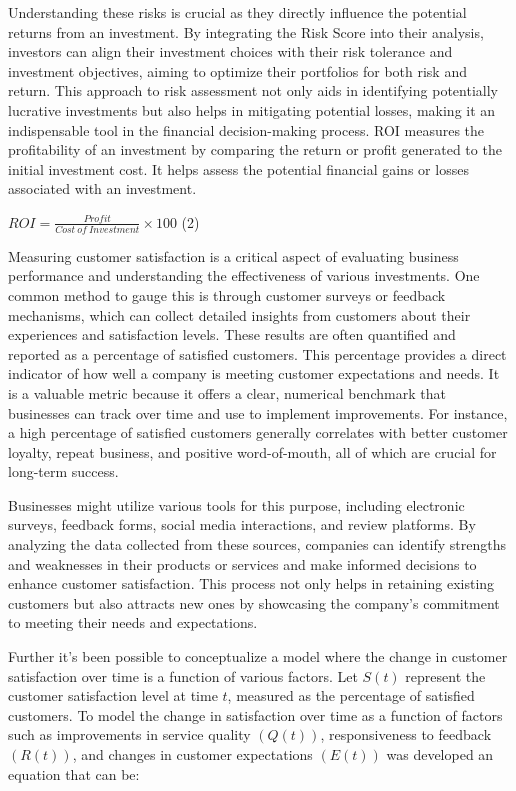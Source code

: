 \documentclass[
]{article}
\begin{document}
Understanding these risks is crucial as they directly influence the
potential returns from an investment. By integrating the Risk Score into
their analysis, investors can align their investment choices with their
risk tolerance and investment objectives, aiming to optimize their
portfolios for both risk and return. This approach to risk assessment
not only aids in identifying potentially lucrative investments but also
helps in mitigating potential losses, making it an indispensable tool in
the financial decision-making process. ROI measures the profitability of
an investment by comparing the return or profit generated to the initial
investment cost. It helps assess the potential financial gains or losses
associated with an investment.

\(ROI = \frac{Profit}{Cost\ of\ Investment} \times 100\) (2)

Measuring customer satisfaction is a critical aspect of evaluating
business performance and understanding the effectiveness of various
investments. One common method to gauge this is through customer surveys
or feedback mechanisms, which can collect detailed insights from
customers about their experiences and satisfaction levels. These results
are often quantified and reported as a percentage of satisfied
customers. This percentage provides a direct indicator of how well a
company is meeting customer expectations and needs. It is a valuable
metric because it offers a clear, numerical benchmark that businesses
can track over time and use to implement improvements. For instance, a
high percentage of satisfied customers generally correlates with better
customer loyalty, repeat business, and positive word-of-mouth, all of
which are crucial for long-term success.

Businesses might utilize various tools for this purpose, including
electronic surveys, feedback forms, social media interactions, and
review platforms. By analyzing the data collected from these sources,
companies can identify strengths and weaknesses in their products or
services and make informed decisions to enhance customer satisfaction.
This process not only helps in retaining existing customers but also
attracts new ones by showcasing the company's commitment to meeting
their needs and expectations.

Further it's been possible to conceptualize a model where the change in
customer satisfaction over time is a function of various factors. Let
\(S(t)\) represent the customer satisfaction level at time \(t\),
measured as the percentage of satisfied customers. To model the change
in satisfaction over time as a function of factors such as improvements
in service quality \((Q(t))\), responsiveness to feedback \((R(t))\),
and changes in customer expectations \((E(t))\) was developed an
equation that can be:
\end{document}
